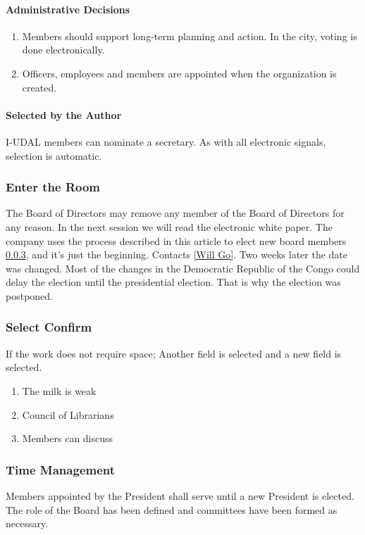 \documentclass{article}
\newcommand{\asubsection}[1]{\subsubsection{#1} \label{#1}}
\newcommand{\asubsubsection}[1]{\paragraph{#1} \label{#1}}
\begin{document}
\asubsubsection{Administrative Decisions}
\begin{enumerate}
	\item Members should support long-term planning and action.
	      In the city, voting is done electronically.
	\item Officers, employees and members are appointed when the organization is created.
\end{enumerate}

\asubsubsection{Selected by the Author}
I-UDAL members can nominate a secretary.
As with all electronic signals, selection is automatic.

\asubsection{Enter the Room}
The Board of Directors may remove any member of the Board of Directors for any reason.
In the next session we will read the electronic white paper.
The company uses the process described in this article to elect new board members \ref{Time Management}, and it's just the beginning.
Contacts \ref{Will Go}. Two weeks later the date was changed.
Most of the changes in the Democratic Republic of the Congo could delay the election until the presidential election. That is why the election was postponed.

\asubsection{Select Confirm}
If the work does not require space; Another field is selected and a new field is selected.
\begin{enumerate}
	\item[1.] The milk is weak
	\item[2.] Council of Librarians
	\item[3.] Members can discuss
\end{enumerate}

\asubsection{Time Management}
Members appointed by the President shall serve until a new President is elected. %
The role of the Board has been defined and committees have been formed as necessary.
\end{document}
